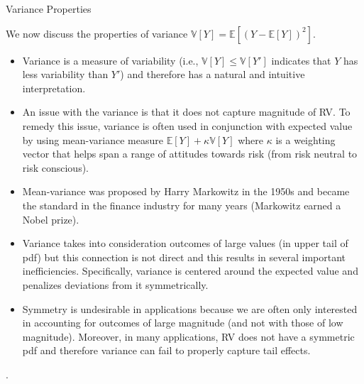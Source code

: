\documentclass[9pt]{beamer}
\begin{document}
%
\begin{frame}{Variance Properties}


We now discuss the properties of variance $\mathbb{V}[Y]=\mathbb{E}[(Y-\mathbb{E}[Y])^2]$.

\begin{itemize}
\item Variance is a measure of variability (i.e., $\mathbb{V}[Y]\leq \mathbb{V}[Y']$ indicates that $Y$ has less variability than $Y'$) and therefore has a natural and intuitive interpretation.  

\item An issue with the variance is that it does not capture magnitude of RV. To remedy this issue, variance is often used in conjunction with expected value by using mean-variance measure $\mathbb{E}[Y]+\kappa\mathbb{V}[Y]$ where $\kappa$ is a weighting vector that helps span a range of attitudes towards risk (from risk neutral to risk conscious). 

\item Mean-variance was proposed by Harry Markowitz in the 1950s and became the standard in the finance industry for many years (Markowitz earned a Nobel prize). 

\item Variance takes into consideration outcomes of large values (in upper tail of pdf) but this connection is not direct and this results in several important inefficiencies.   Specifically, variance is centered around the expected value and penalizes deviations from it symmetrically. 

\item Symmetry is undesirable in applications because we are often only interested in accounting for outcomes of large magnitude (and not with those of low magnitude).  Moreover, in many applications,  RV does not have a symmetric pdf and therefore variance can fail to properly capture tail effects.  

\end{itemize}
. 


\end{frame}
\end{document}
